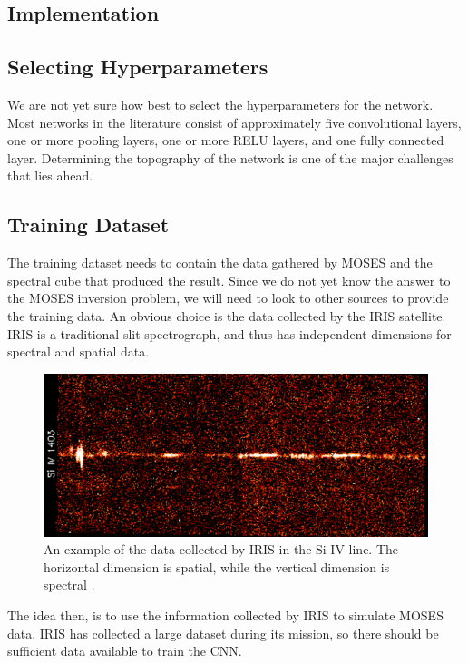 \documentclass[twoside]{article}
\begin{document}
\begin{multicols}{2}
\section{Implementation}
\subsection{Selecting Hyperparameters}
We are not yet sure how best to select the hyperparameters for the network. Most networks in the literature consist of approximately five convolutional layers, one or more pooling layers, one or more RELU layers, and one fully connected layer. Determining the topography of the network is one of the major challenges that lies ahead.
\subsection{Training Dataset}
The training dataset needs to contain the data gathered by MOSES and the spectral cube that produced the result. Since we do not yet know the answer to the MOSES inversion problem, we will need to look to other sources to provide the training data. An obvious choice is the data collected by the IRIS satellite. IRIS is a traditional slit spectrograph, and thus has independent dimensions for spectral and spatial data. 
\begin{figure}[H]
	\centering
	\includegraphics[width=\linewidth]{images/iris}
	\caption{An example of the data collected by IRIS in the Si IV line. The horizontal dimension is spatial, while the vertical dimension is spectral \cite{iris}.}
\end{figure}
The idea then, is to use the information collected by IRIS to simulate MOSES data. IRIS has collected a large dataset during its mission, so there should be sufficient data available to train the CNN.

\end{multicols}
\end{document}
